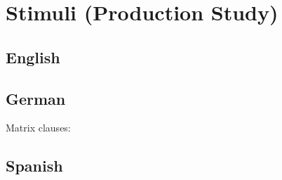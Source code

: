 \documentclass[11pt,a4paper]{article}
\begin{document}







\newpage
\section{Stimuli (Production Study)}

\subsection{English}






\subsection{German}




Matrix clauses:




\subsection{Spanish}







\end{document}
